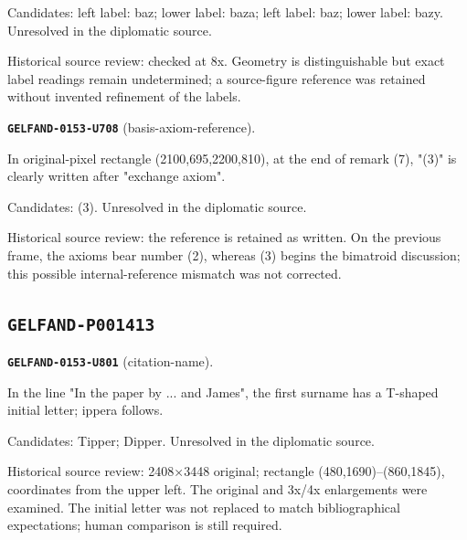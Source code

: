 Candidates: left label: baz; lower label: baza; left label: baz; lower label: bazy. Unresolved in the diplomatic source.\par
Historical source review: checked at 8x. Geometry is distinguishable but exact label readings remain undetermined; a source-figure reference was retained without invented refinement of the labels.\par\medskip
\par\noindent\leavevmode{}\label{GELFAND-0153-U708}\textbf{\texttt{GELFAND-0153-U708}} (basis-axiom-reference).\nopagebreak[4]\par
In original-pixel rectangle (2100,695,2200,810), at the end of remark (7), "(3)" is clearly written after "exchange axiom".\par
Candidates: (3). Unresolved in the diplomatic source.\par
Historical source review: the reference is retained as written. On the previous frame, the axioms bear number (2), whereas (3) begins the bimatroid discussion; this possible internal-reference mismatch was not corrected.\par\medskip
\subsection*{\texttt{GELFAND-P001413}}
\par\noindent\leavevmode{}\label{GELFAND-0153-U801}\textbf{\texttt{GELFAND-0153-U801}} (citation-name).\nopagebreak[4]\par
In the line "In the paper by ... and James", the first surname has a T-shaped initial letter; ippera follows.\par
Candidates: Tipper; Dipper. Unresolved in the diplomatic source.\par
Historical source review: 2408×3448 original; rectangle (480,1690)–(860,1845), coordinates from the upper left. The original and 3x/4x enlargements were examined. The initial letter was not replaced to match bibliographical expectations; human comparison is still required.\par\medskip
